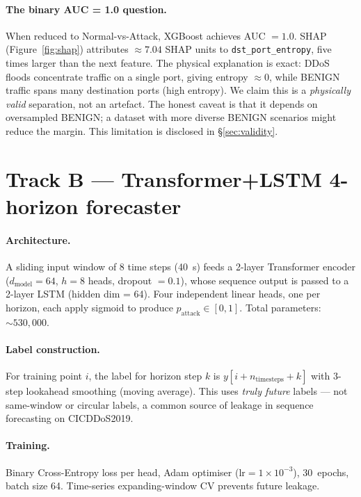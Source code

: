 \paragraph{The binary AUC = 1.0 question.}
\label{sec:binary-auc}
When reduced to Normal-vs-Attack, XGBoost achieves AUC $= 1.0$.
SHAP (Figure~\ref{fig:shap}) attributes $\approx 7.04$ SHAP units to
\texttt{dst\_port\_entropy}, five times larger than the next feature.
The physical explanation is exact: DDoS floods concentrate traffic
on a single port, giving entropy $\approx 0$, while BENIGN traffic
spans many destination ports (high entropy). We claim this is a
\emph{physically valid} separation, not an artefact. The honest
caveat is that it depends on oversampled BENIGN; a dataset with more
diverse BENIGN scenarios might reduce the margin. This limitation is
disclosed in \S\ref{sec:validity}.

\section{Track B --- Transformer+LSTM 4-horizon forecaster}
\label{sec:forecast}

\paragraph{Architecture.}
A sliding input window of 8 time steps (40~s) feeds a
2-layer Transformer encoder ($d_{\text{model}} = 64$, $h = 8$ heads,
dropout $= 0.1$), whose sequence output is passed to a 2-layer LSTM
(hidden dim = 64). Four independent linear heads, one per horizon, each
apply sigmoid to produce $p_{\text{attack}} \in [0,1]$.
Total parameters: $\sim\!530{,}000$.

\paragraph{Label construction.}
For training point $i$, the label for horizon step $k$ is
$y[i + n_{\text{timesteps}} + k]$ with 3-step lookahead smoothing
(moving average). This uses \emph{truly future} labels --- not
same-window or circular labels, a common source of leakage in
sequence forecasting on CICDDoS2019.

\paragraph{Training.}
Binary Cross-Entropy loss per head, Adam optimiser
($\text{lr} = 1\!\times\!10^{-3}$), 30~epochs, batch size 64.
Time-series expanding-window CV prevents future leakage.

